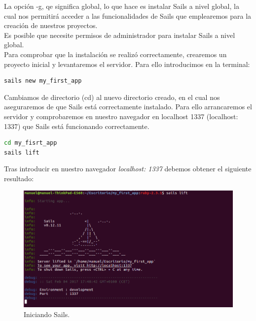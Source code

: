 \begin{appendix}
La opción -g, qe significa global, lo que hace es instalar Sails a nivel global, la cual nos permitirá acceder a las funcionalidades de Sails que emplearemos para la creación de nuestros proyectos.\\

Es posible que necesite permisos de administrador para instalar Sails a nivel global.\\

Para comprobar que la instalación se realizó correctamente, crearemos un proyecto inicial y levantaremos el servidor. Para ello introducimos en la terminal:\\

\begin{lstlisting}[language=bash]
sails new my_first_app
\end{lstlisting}

Cambiamos de directorio (cd) al nuevo directorio creado, en el cual nos aseguraremos de que Sails está correctamente instalado. Para ello arrancaremos el servidor y comprobaremos en nuestro navegador en localhost 1337 (localhost: 1337) que Sails está funcionando correctamente.\\


\begin{lstlisting}[language=bash]
cd my_fisrt_app
sails lift
\end{lstlisting}


Tras introducir en nuestro navegador \emph{localhost: 1337} debemos obtener el siguiente resultado:


\begin{figure}[H]
  \begin{center}
    \includegraphics[scale=0.3]{imagenes/running_sails.png}
  \end{center}
  \label{fig:logo}
 \caption{Iniciando Sails.}
\end{figure}



\end{appendix}
